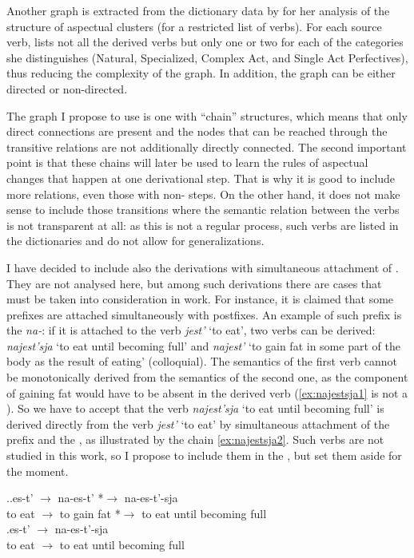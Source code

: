 Another graph is extracted from the dictionary data by \citet{Janda:07a} for her analysis of the structure of aspectual clusters (for a restricted list of verbs). For each source verb, \citeauthor{Janda:07a} lists not all the derived verbs but only one or two for each of the categories she distinguishes (Natural, Specialized, Complex Act, and Single Act Perfectives), thus reducing the complexity of the graph. In addition, the graph can be either directed or non-directed. 
 
The graph I propose to use is one with ``chain'' structures, which means that only direct connections are present and the nodes that can be reached through the transitive relations are not additionally directly connected. The second important point is that these chains will later be used to learn the rules of aspectual changes that happen at one derivational step. That is why it is good to include more relations, even those with non- steps. On the other hand, it does not make sense to include those transitions where the semantic relation between the verbs is not transparent at all: as this is not a regular process, such verbs are listed in the dictionaries and do not allow for generalizations. 

I have decided to include also the derivations with simultaneous attachment of . They are not analysed here, but among such derivations there are cases that must be taken into consideration in  work. For instance, it is claimed that some prefixes are attached simultaneously with postfixes. An example of such prefix is the  \textit{na-}: if it is attached to the verb \textit{jest'} `to eat', two verbs can be derived: \textit{najest'sja} `to eat until becoming full' and \textit{najest'} `to gain fat in some part of the body as the result of eating' (colloquial). The semantics of the first verb cannot be  monotonically derived from the semantics of the second one, as the component of gaining fat would have to be absent in the derived verb (\ref{ex:najestsja1} is not a ). So we have to accept that the verb \textit{najest'sja} `to eat until becoming full' is derived directly from the verb \textit{jest'} `to eat' by simultaneous attachment of the prefix and the , as illustrated by the chain \ref{ex:najestsja2}. Such verbs are not studied in this work, so I propose to include them in the , but set them aside for the moment.
 
 \ex.\label{ex:najestsja}\ag.\label{ex:najestsja1}es-t'\textsuperscript{\IPF} $\rightarrow$ na-es-t'\textsuperscript{\PF} *$\rightarrow$ na-es-t'-sja\textsuperscript{\PF}\\	
{to eat} $\rightarrow$ {to gain fat} *$\rightarrow$ {to eat until becoming full}\\
\bg.\label{ex:najestsja2}es-t'\textsuperscript{\PF} $\rightarrow$ na-es-t'-sja\textsuperscript{\PF}\\
{to eat} $\rightarrow$ {to eat until becoming full}\\

